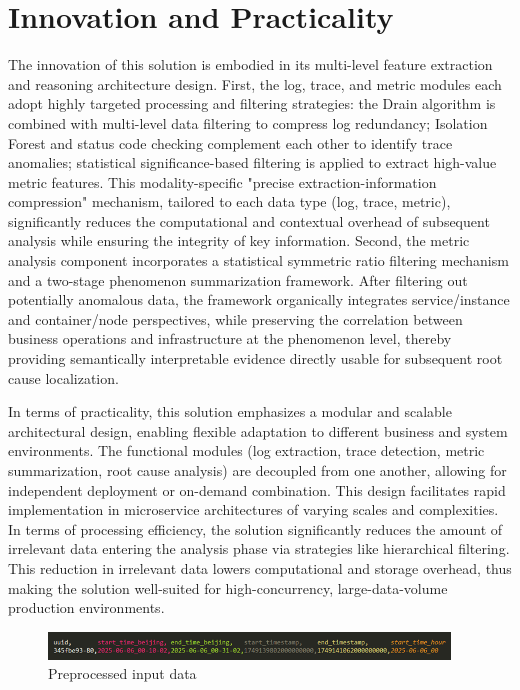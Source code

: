 \documentclass[10pt]{article}
\begin{document}
\section{Innovation and Practicality}
\label{sec:innovation}

The innovation of this solution is embodied in its multi-level feature extraction and reasoning architecture design. First, the log, trace, and metric modules each adopt highly targeted processing and filtering strategies: the Drain algorithm is combined with multi-level data filtering to compress log redundancy; Isolation Forest and status code checking complement each other to identify trace anomalies; statistical significance-based filtering is applied to extract high-value metric features. This modality-specific "precise extraction-information compression" mechanism, tailored to each data type (log, trace, metric), significantly reduces the computational and contextual overhead of subsequent analysis while ensuring the integrity of key information. Second, the metric analysis component incorporates a statistical symmetric ratio filtering mechanism and a two-stage phenomenon summarization framework. After filtering out potentially anomalous data, the framework organically integrates service/instance and container/node perspectives, while preserving the correlation between business operations and infrastructure at the phenomenon level, thereby providing semantically interpretable evidence directly usable for subsequent root cause localization.

In terms of practicality, this solution emphasizes a modular and scalable architectural design, enabling flexible adaptation to different business and system environments. The functional modules (log extraction, trace detection, metric summarization, root cause analysis) are decoupled from one another, allowing for independent deployment or on-demand combination. This design facilitates rapid implementation in microservice architectures of varying scales and complexities. In terms of processing efficiency, the solution significantly reduces the amount of irrelevant data entering the analysis phase via strategies like hierarchical filtering. This reduction in irrelevant data lowers computational and storage overhead, thus making the solution well-suited for high-concurrency, large-data-volume production environments.

\begin{figure}[htbp]
    \centering
    \includegraphics[width=0.95\textwidth]{pics/fig3.png}
    \caption{Preprocessed input data}
    \label{fig3}
\end{figure}
\end{document}
